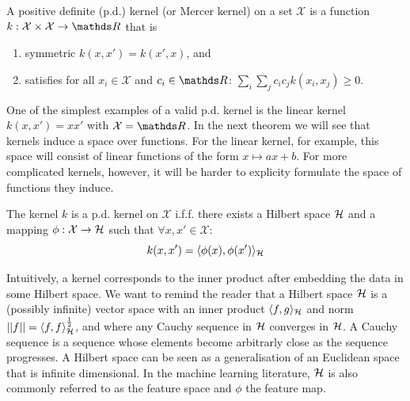 \begin{definition}
A positive definite (p.d.) kernel (or Mercer kernel) on a set $\mathcal{X}$ is a function $k: \mathcal{X} \times \mathcal{X} \rightarrow \Reals$ that is
\begin{enumerate}
  \item symmetric $k(x, x') = k(x', x)$, and
  \item satisfies for all $x_i \in \mathcal{X}$ and $c_i \in \Reals$: $\sum_{i}\sum_j c_i c_j k(x_i, x_j)\ge 0$.
\end{enumerate}
\end{definition}
One of the simplest examples of a valid p.d. kernel is the linear kernel $k(x, x') = xx'$ with $\mathcal{X} = \Reals$. In the next theorem we will see that kernels induce a space over functions. For the linear kernel, for example, this space will consist of linear functions of the form $x \mapsto a x + b$. For more complicated kernels, however, it will be harder to explicity formulate the space of functions they induce.
\begin{theorem}
  \label{theorem:k-and-H}
  The kernel $k$ is a p.d. kernel on $\mathcal{X}$ i.f.f. there exists a Hilbert space ${\mathcal{H}}$ and a mapping $\phi: \mathcal{X} \rightarrow {\mathcal{H}}$ such that $\forall x,x' \in \mathcal{X}$:
  \begin{equation}
    k(x, x') = \langle \phi(x), \phi(x') \rangle_{{\mathcal{H}}}
  \end{equation}
\end{theorem}
Intuitively, a kernel corresponds to the inner product after embedding the data in some Hilbert space. We want to remind the reader that a Hilbert space ${\mathcal{H}}$ is a (possibly infinite) vector space with an inner product $\langle f, g \rangle_{{\mathcal{H}}}$ and norm $\lvert\lvert f\rvert\rvert = \langle f, f \rangle_{{\mathcal{H}}}^{\frac{1}{2}}$, and where any Cauchy sequence in ${\mathcal{H}}$ converges in ${\mathcal{H}}$. A Cauchy sequence is a sequence whose elements become arbitrarly close as the sequence progresses. A Hilbert space can be seen as a generalisation of an Euclidean space that is infinite dimensional. In the machine learning literature, ${\mathcal{H}}$ is also commonly referred to as the feature space and $\phi$ the feature map.

